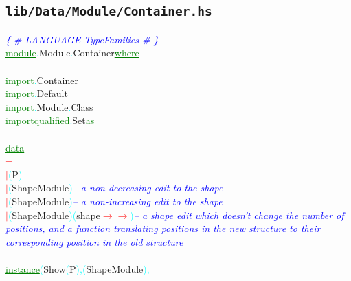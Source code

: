\subsection{\texttt{lib/Data/Module/Container.hs}}
\label{mod:Data.Module.Container}
\textcolor{blue}{{\it{}\{-\# LANGUAGE TypeFamilies \#-\}}}\\\textcolor{green}{\underline{module}}\textcolor{cyan}{.}{\rm{}Module}\textcolor{cyan}{.}{\rm{}Container}\hsspace \textcolor{green}{\underline{where}}\\\\\textcolor{green}{\underline{import}}\textcolor{cyan}{.}{\rm{}Container}\\\textcolor{green}{\underline{import}}\textcolor{cyan}{.}{\rm{}Default}\\\textcolor{green}{\underline{import}}\textcolor{cyan}{.}{\rm{}Module}\textcolor{cyan}{.}{\rm{}Class}\\\textcolor{green}{\underline{import}}\hsspace \textcolor{green}{\underline{qualified}}\textcolor{cyan}{.}{\rm{}Set}\hsspace \textcolor{green}{\underline{as}}\\\\\textcolor{green}{\underline{data}}\\\hstab \textcolor{red}{=}\\\hstab \textcolor{red}{\ensuremath{|}}\hsspace \textcolor{cyan}{(}{\rm{}P}\textcolor{cyan}{)}\\\hstab \textcolor{red}{\ensuremath{|}}\hsspace \textcolor{cyan}{(}{\rm{}ShapeModule}\textcolor{cyan}{)}\hsspace \textcolor{blue}{{\it{}-- a non-decreasing edit to the shape}}\\\hstab \textcolor{red}{\ensuremath{|}}\hsspace \textcolor{cyan}{(}{\rm{}ShapeModule}\textcolor{cyan}{)}\hsspace \textcolor{blue}{{\it{}-- a non-increasing edit to the shape}}\\\hstab \textcolor{red}{\ensuremath{|}}\hsspace \textcolor{cyan}{(}{\rm{}ShapeModule}\textcolor{cyan}{)}\hsspace \textcolor{cyan}{(}{\rm{}shape}\hsspace \textcolor{red}{\ensuremath{\rightarrow}}\hsspace \textcolor{red}{\ensuremath{\rightarrow}}\textcolor{cyan}{)}\hsspace \textcolor{blue}{{\it{}-- a shape edit which doesn't change the number of positions, and a function translating positions in the new structure to their corresponding position in the old structure}}\\\\\textcolor{green}{\underline{instance}}\hsspace \textcolor{cyan}{(}{\rm{}Show}\hsspace \textcolor{cyan}{(}{\rm{}P}\textcolor{cyan}{)}\textcolor{cyan}{,}\hsspace \textcolor{cyan}{(}{\rm{}ShapeModule}\textcolor{cyan}{)}\textcolor{cyan}{,}\hsspace 